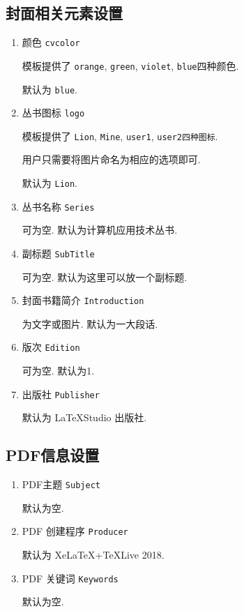   \subsection{封面相关元素设置} \label{sbsec:封面相关元素设置}
    \begin{enumerate}
      \item 颜色 \verb|cvcolor|

        模板提供了 \verb|orange|, \verb|green|, \verb|violet|, \verb|blue|四种颜色.

        默认为 \verb|blue|.

      \item {丛书图标} \verb|logo|

        模板提供了 \verb|Lion|, \verb|Mine|, \verb|user1|, \verb|user2四种图标|.

        用户只需要将图片命名为相应的选项即可.

        默认为 \verb|Lion|.

      \item 丛书名称 \verb|Series|

        可为空. 默认为计算机应用技术丛书.

      \item 副标题 \verb|SubTitle|

        可为空. 默认为这里可以放一个副标题.

      \item 封面书籍简介 \verb|Introduction|

        为文字或图片. 默认为一大段话.

      \item 版次 \verb|Edition|

        可为空. 默认为1.

      \item 出版社 \verb|Publisher|

        默认为 \LaTeX Studio 出版社.
    \end{enumerate}

  \subsection{PDF信息设置} \label{sbsec:PDF信息设置}
    \begin{enumerate}
      \item PDF主题 \verb|Subject|

        默认为空.

      \item PDF 创建程序 \verb|Producer|

        默认为 XeLaTeX+TeXLive 2018.

      \item PDF 关键词 \verb|Keywords|

        默认为空.
    \end{enumerate}

